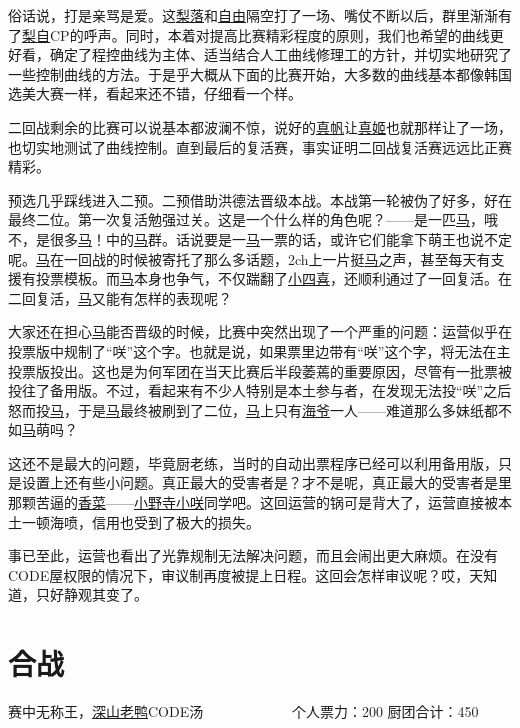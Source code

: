 俗话说，打是亲骂是爱。这\uline{梨落}和\uline{自由}隔空打了一场、嘴仗不断以后，群里渐渐有了\uline{梨}\uline{自}CP的呼声。同时，本着对提高比赛精彩程度的原则，我们也希望的曲线更好看，确定了程控曲线为主体、适当结合人工曲线修理工的方针，并切实地研究了一些控制曲线的方法。于是乎大概从下面的比赛开始，大多数的曲线基本都像韩国选美大赛一样，看起来还不错，仔细看一个样。

二回战剩余的比赛可以说基本都波澜不惊，说好的\uline{真帆}让\uline{真姬}也就那样让了一场，也切实地测试了曲线控制。直到最后的复活赛，事实证明二回战复活赛远远比正赛精彩。

预选几乎踩线进入二预。二预借助洪德法晋级本战。本战第一轮被伪了好多，好在最终二位。第一次复活勉强过关。这是一个什么样的角色呢？——是一匹\uline{马}，哦不，是很多\uline{马}！中的\uline{马}群。话说要是一\uline{马}一票的话，或许它们能拿下萌王也说不定呢。\uline{马}在一回战的时候被寄托了那么多话题，2ch上一片挺\uline{马}之声，甚至每天有支援有投票模板。而\uline{马}本身也争气，不仅踹翻了\uline{小四喜}，还顺利通过了一回复活。在二回复活，\uline{马}又能有怎样的表现呢？

大家还在担心\uline{马}能否晋级的时候，比赛中突然出现了一个严重的问题：运营似乎在投票版中规制了“咲”这个字。也就是说，如果票里边带有“咲”这个字，将无法在主投票版投出。这也是为何军团在当天比赛后半段萎蔫的重要原因，尽管有一批票被投往了备用版。不过，看起来有不少人特别是本土参与者，在发现无法投“咲”之后怒而投\uline{马}，于是\uline{马}最终被刷到了二位，\uline{马}上只有\uline{海爷}一人——难道那么多妹纸都不如\uline{马}萌吗？

这还不是最大的问题，毕竟厨老练，当时的自动出票程序已经可以利用备用版，只是设置上还有些小问题。真正最大的受害者是？才不是呢，真正最大的受害者是里那颗苦逼的\uline{香菜}——\uline{小野寺小咲}同学吧。这回运营的锅可是背大了，运营直接被本土一顿海喷，信用也受到了极大的损失。

事已至此，运营也看出了光靠规制无法解决问题，而且会闹出更大麻烦。在没有CODE屋权限的情况下，审议制再度被提上日程。这回会怎样审议呢？哎，天知道，只好静观其变了。

\chapter{合战}
\begin{center}
{\subTitle 赛中无称王，\uline{深山老鸭}CODE汤}
\subMemo
　　　　　　个人票力：200 厨团合计：450
\end{center}

